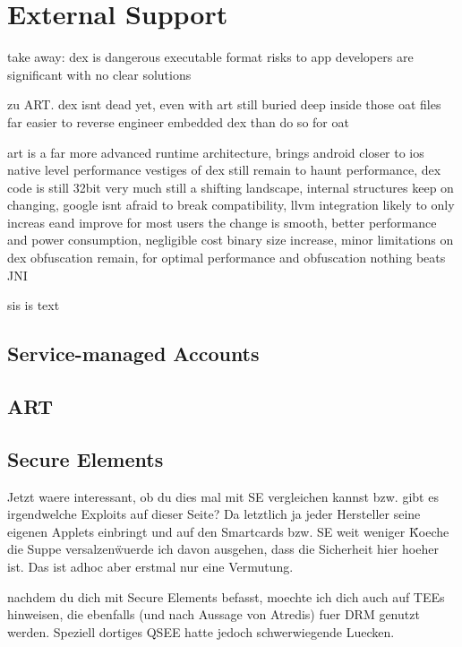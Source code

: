 \section{External Support} \label{section:evaluation-external}





%
take away:
dex is dangerous executable format
risks to app developers are significant with no clear solutions

zu ART.
dex isnt dead yet, even with art
still buried deep inside those oat files
far easier to reverse engineer embedded dex than do so for oat

art is a far more advanced runtime architecture, brings android closer to ios native level performance
vestiges of dex still remain to haunt performance, dex code is still 32bit
very much still a shifting landscape, internal structures keep on changing, google isnt afraid to break compatibility, llvm integration likely to only increas eand improve
for most users the change is smooth, better performance and power consumption, negligible cost binary size increase, minor limitations on dex obfuscation remain, for optimal performance and obfuscation nothing beats JNI
\cite{andevconDalvikART}
%

sis is text
\subsection{Service-managed Accounts}
\subsection{ART}
\subsection{Secure Elements}
Jetzt waere interessant, ob du dies mal mit SE vergleichen kannst bzw. gibt es irgendwelche Exploits auf dieser Seite? Da letztlich ja jeder Hersteller seine eigenen Applets einbringt und auf den Smartcards bzw. SE weit weniger \"Koeche die Suppe versalzen\" wuerde ich davon ausgehen, dass die Sicherheit hier hoeher ist. Das ist adhoc aber erstmal nur eine Vermutung.



nachdem du dich mit Secure Elements befasst, moechte ich dich auch auf TEEs hinweisen, die ebenfalls (und nach Aussage von Atredis) fuer DRM genutzt werden. Speziell dortiges QSEE hatte jedoch schwerwiegende Luecken.

